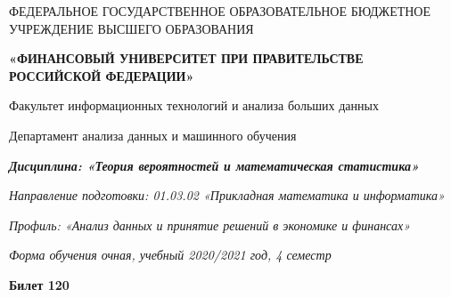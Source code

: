\documentclass[a4paper,10pt]{article}
\begin{document}
\begin{center}
ФЕДЕРАЛЬНОЕ ГОСУДАРСТВЕННОЕ ОБРАЗОВАТЕЛЬНОЕ БЮДЖЕТНОЕ УЧРЕЖДЕНИЕ ВЫСШЕГО ОБРАЗОВАНИЯ

    \textbf{«ФИНАНСОВЫЙ УНИВЕРСИТЕТ ПРИ ПРАВИТЕЛЬСТВЕ РОССИЙСКОЙ ФЕДЕРАЦИИ»}

Факультет информационных технологий и анализа больших данных

Департамент анализа данных и машинного обучения

\textit{
	\textbf{Дисциплина: «Теория вероятностей и математическая статистика»}}

\textit{Направление подготовки: 01.03.02 «Прикладная математика и информатика»}

\textit{Профиль: «Анализ данных и принятие решений в экономике и финансах»}

\textit{Форма обучения очная, учебный 2020/2021 год, 4 семестр}

\textbf{Билет 120}

\end{center}
\end{document}
